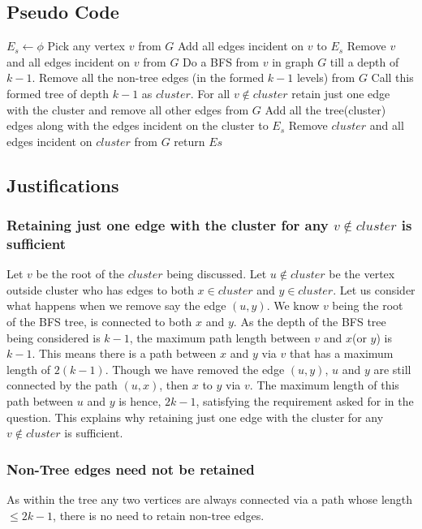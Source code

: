 \documentclass{article}
\begin{document}
\subsection{Pseudo Code}
\begin{algorithmic}[1]
  \State $E_s \gets \phi$
  \State Pick any vertex $v$ from $G$ 
  \State Add all edges incident on $v$ to $E_s$
  \State Remove $v$ and all edges incident on $v$ from $G$
  \Else
  \State Do a BFS from $v$ in graph $G$ till a depth of $k-1$.  
  \State Remove all the non-tree edges (in the formed $k-1$ levels) from $G$
  \State Call this formed tree of depth $k-1$ as $cluster$. 
  \State For all $v \not\in cluster$ retain just one edge with the cluster and remove all other edges from $G$
  \State Add all the tree(cluster) edges along with the edges incident on the cluster to $E_s$
  \State Remove $cluster$ and all edges incident on $cluster$ from $G$
  \EndIf
  \EndWhile
  \State return $Es$
  \EndProcedure
\end{algorithmic} 
\subsection{Justifications}
\subsubsection{Retaining just one edge with the cluster for any $v \not\in cluster$ is sufficient}
Let $v$ be the root of the $cluster$ being discussed. Let $u \not \in cluster$ be the vertex outside cluster who has edges to both $x \in cluster $ and $y \in cluster$. Let us consider what happens when we remove say the edge $(u,y)$. We know $v$ being the root of the BFS tree, is connected to both $x$ and $y$. As the depth of the BFS tree being considered is $k-1$, the maximum path length between $v$ and $x$(or $y$) is $k-1$. This means there is a path between $x$ and $y$ via $v$ that has a maximum length of $2(k-1)$. Though we have removed the edge $(u,y)$, $u$ and $y$ are still connected by the path $(u,x)$, then $x$ to $y$ via $v$. The maximum length of this path between $u$ and $y$ is hence, $2k-1$, satisfying the requirement asked for in the question. This explains why retaining just one edge with the cluster for any $v \not\in cluster$ is sufficient.
\subsubsection{Non-Tree edges need not be retained}
As within the tree any two vertices are always connected via a path whose length $\leq 2k-1$, there is no need to retain non-tree edges.
\end{document}
